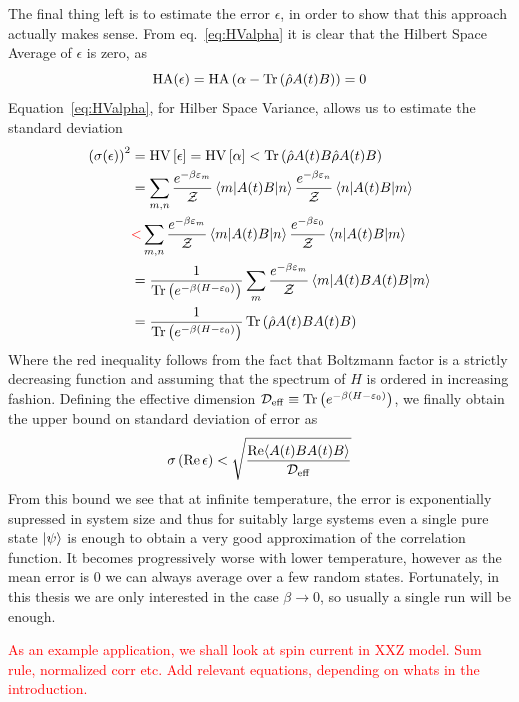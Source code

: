 The final thing left is to estimate the error \(\epsilon\), in order to show that this approach actually makes sense.
From eq.~\eqref{eq:HValpha} it is clear that the Hilbert Space Average of \(\epsilon\) is zero, as
\begin{equation}
	\mathrm{HA}(\epsilon) = \mathrm{HA}\left(\alpha - \Tr\left(\hat{\rho}A(t)B\right)\right) = 0
\end{equation}
Equation~\eqref{eq:HValpha}, for Hilber Space Variance, allows us to estimate the standard deviation 
\begin{align}
	\left(\sigma(\epsilon)\right)^2 &= \mathrm{HV}\left[\epsilon\right] = \mathrm{HV}\left[\alpha\right] < \Tr\left(\hat{\rho}A(t)B \hat{\rho}A(t)B\right) \nonumber\\
	&= \sum_{m,n} \frac{e^{-\beta \varepsilon_m}}{\mathcal{Z}} \matrixel{m}{A(t)B}{n} \frac{e^{-\beta \varepsilon_n}}{\mathcal{Z}} \matrixel{n}{A(t)B}{m}\nonumber \\
	&\textcolor{red}{<}  \sum_{m,n} \frac{e^{-\beta \varepsilon_m}}{\mathcal{Z}} \matrixel{m}{A(t)B}{n} \frac{e^{-\beta \varepsilon_0}}{\mathcal{Z}} \matrixel{n}{A(t)B}{m} \nonumber\\
	&= \frac{1}{\Tr\left(e^{-\beta(H-\varepsilon_0)}\right)} \sum_{m} \frac{e^{-\beta \varepsilon_m}}{\mathcal{Z}} \matrixel{m}{A(t)B A(t) B}{m} \nonumber\\
	&= \frac{1}{\Tr\left(e^{-\beta(H-\varepsilon_0)}\right)} \Tr\left(\hat{\rho} A(t)B A(t) B\right)
\end{align}
Where the red inequality follows from the fact that Boltzmann factor is a strictly decreasing function and assuming that the spectrum
of \(H\) is ordered in increasing fashion. Defining the effective dimension \(\mathcal{D}_{\mathrm{eff}} \equiv \Tr\left(e^{-\beta(H-\varepsilon_0)}\right)\),
we finally obtain the upper bound on standard deviation of error as 
\begin{equation}
	\sigma\left(\Re \epsilon\right) < \sqrt{\frac{\Re \langle A(t)B A(t) B \rangle}{\mathcal{D}_{\mathrm{eff}}}}
\end{equation}
From this bound we see that at infinite temperature, the error is exponentially supressed in system size and thus for suitably
large systems even a single pure state \(\ket{\psi}\) is enough to obtain a very good approximation of the correlation function.
It becomes progressively worse with lower temperature, however as the mean error is \(0\) we can always average over a few random
states. Fortunately, in this thesis we are only interested in the case \(\beta \to 0\), so usually a single run will be enough.

\textcolor{red}{
As an example application, we shall look at spin current in XXZ model. Sum rule, normalized corr etc.
}
\textcolor{red}{Add relevant equations, depending on whats in the introduction.}




